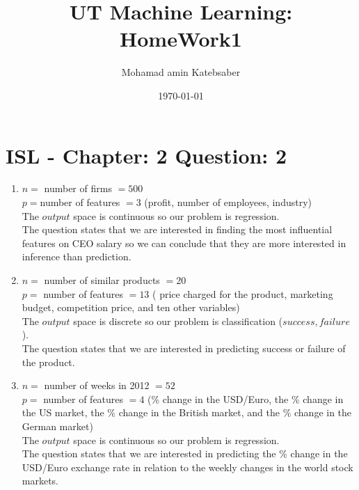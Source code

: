 \documentclass[12pt]{article}
\begin{document}
\title{UT Machine Learning: HomeWork1}
\author{Mohamad amin Katebsaber}
\date{\today}
\maketitle

\section{ISL - Chapter: 2 Question: 2}
\begin{enumerate}
\item  $n = $ number of firms $= 500$\\
$p = $number of features $= 3$ (profit, number of employees, industry)\\
The $output$ space is continuous so our problem is regression.\\
The question states that we are interested in finding the most influential features on CEO salary so we can conclude that they are more interested in inference than prediction.

\item $n = $ number of similar products $= 20$\\
$p = $ number of features $= 13$ ( price
charged for the product, marketing budget, competition price,
and ten other variables)\\
The $output$ space is discrete so our problem is classification ($success, failure$).\\
The question states that we are interested in predicting success or failure of the product.

\item $n = $ number of weeks in 2012 $= 52$\\
$p = $ number of features $= 4$ (\% change in the USD/Euro, the \% change in the US market, the \% change in the British market, and the \% change in the German market)\\
The $output$ space is continuous so our problem is regression.\\
The question states that we are interested in predicting the \% change in the USD/Euro exchange rate in relation to the weekly changes in the world stock markets.
\end{enumerate}
\end{document}
